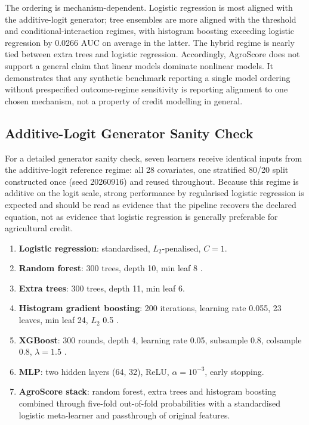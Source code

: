 \documentclass[journal]{IEEEtran}
\newcommand{\auc}{\mbox{AUC}}
\begin{document}
The ordering is mechanism-dependent. Logistic regression is most aligned with the additive-logit generator; tree ensembles are more aligned with the threshold and conditional-interaction regimes, with histogram boosting exceeding logistic regression by 0.0266 $\auc$ on average in the latter. The hybrid regime is nearly tied between extra trees and logistic regression. Accordingly, AgroScore does not support a general claim that linear models dominate nonlinear models. It demonstrates that any synthetic benchmark reporting a single model ordering without prespecified outcome-regime sensitivity is reporting alignment to one chosen mechanism, not a property of credit modelling in general.

\subsection{Additive-Logit Generator Sanity Check}
For a detailed generator sanity check, seven learners receive identical inputs from the additive-logit reference regime: all 28 covariates, one stratified 80/20 split constructed once (seed 20260916) and reused throughout. Because this regime is additive on the logit scale, strong performance by regularised logistic regression is expected and should be read as evidence that the pipeline recovers the declared equation, not as evidence that logistic regression is generally preferable for agricultural credit.

\begin{enumerate}
\item \textbf{Logistic regression}: standardised, $L_2$-penalised, $C=1$.
\item \textbf{Random forest}: 300 trees, depth 10, min leaf 8 \cite{breiman2001rf}.
\item \textbf{Extra trees}: 300 trees, depth 11, min leaf 6.
\item \textbf{Histogram gradient boosting}: 200 iterations, learning rate 0.055, 23 leaves, min leaf 24, $L_2$ 0.5 \cite{friedman2001gbm}.
\item \textbf{XGBoost}: 300 rounds, depth 4, learning rate 0.05, subsample 0.8, colsample 0.8, $\lambda=1.5$ \cite{chen2016xgboost}.
\item \textbf{MLP}: two hidden layers (64, 32), ReLU, $\alpha=10^{-3}$, early stopping.
\item \textbf{AgroScore stack}: random forest, extra trees and histogram boosting combined through five-fold out-of-fold probabilities with a standardised logistic meta-learner and passthrough of original features.
\end{enumerate}
\end{document}
